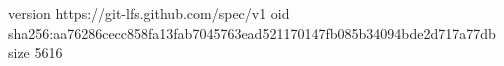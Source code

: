 version https://git-lfs.github.com/spec/v1
oid sha256:aa76286cecc858fa13fab7045763ead521170147fb085b34094bde2d717a77db
size 5616

